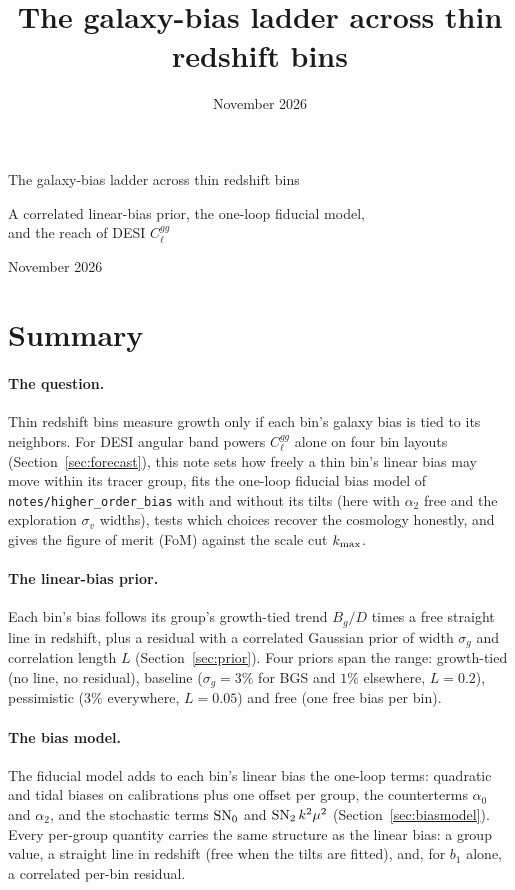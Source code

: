 \documentclass[11pt]{article}
\title{The galaxy-bias ladder across thin redshift bins}
\date{November 2026}
\author{}
\newcommand{\kmax}{k_{\rm max}}
\newcommand{\SNz}{{\rm SN}_0}
\newcommand{\SNt}{{\rm SN}_2}
\begin{document}
\begin{center}
  {\LARGE The galaxy-bias ladder across thin redshift bins\par}
  \vspace{0.4em}
  {\large A correlated linear-bias prior, the one-loop fiducial model,\\
    and the reach of DESI $C_\ell^{gg}$\par}
  \vspace{0.6em}
  {\large November 2026\par}
\end{center}

\section{Summary}
\label{sec:summary}

\paragraph{The question.}
Thin redshift bins measure growth only if each bin's galaxy bias is
tied to its neighbors.  For DESI angular band powers $C_\ell^{gg}$
alone on four bin layouts (Section~\ref{sec:forecast}), this note sets
how freely a thin bin's linear bias may move within its tracer group,
fits the one-loop fiducial bias model of
\texttt{notes/higher\_order\_bias}
with and without its tilts (here with $\alpha_2$ free and the
exploration $\sigma_v$ widths), tests which choices recover the cosmology
honestly, and gives the figure of merit (FoM) against the scale cut
$\kmax$.

\paragraph{The linear-bias prior.}
Each bin's bias follows its group's growth-tied trend $B_g/D$ times a
free straight line in redshift, plus a residual with a correlated
Gaussian prior of width $\sigma_g$ and correlation length $L$
(Section~\ref{sec:prior}).  Four priors span the range: growth-tied
(no line, no residual), baseline ($\sigma_g = 3\%$ for BGS and $1\%$
elsewhere, $L = 0.2$), pessimistic ($3\%$ everywhere, $L = 0.05$) and
free (one free bias per bin).

\paragraph{The bias model.}
The fiducial model adds to each bin's linear bias the one-loop terms:
quadratic
and tidal biases on calibrations plus one offset per group, the
counterterms $\alpha_0$ and $\alpha_2$, and the stochastic terms
$\SNz$ and $\SNt\,k^2\mu^2$ (Section~\ref{sec:biasmodel}).  Every
per-group quantity carries the same structure as the linear bias: a
group value, a straight line in redshift (free when the tilts are
fitted),
and, for $b_1$ alone, a correlated per-bin residual.
\end{document}
